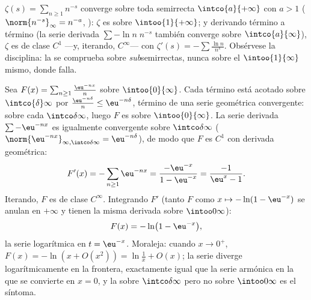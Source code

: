 \begin{example}\label{ex:b2:funcseq:zeta}
$\zeta(s) = \sum_{n\geq1} n^{-s}$ converge  sobre toda
semirrecta $\intco{a}{+\infty}$ con $a > 1$ ($\norm{n^{-s}}_\infty =
n^{-a}$, ): $\zeta$ es  sobre $\intoo{1}{+\infty}$;
y derivando término a término (la serie derivada $\sum -\ln n\;
n^{-s}$ también converge  sobre $\intco{a}{\infty}$),
$\zeta$ es de clase $C^1$ ---y, iterando, $C^\infty$--- con
$\zeta'(s) = -\sum \frac{\ln n}{n^s}$. Obsérvese la disciplina: la
 se comprueba sobre \emph{sub}semirrectas, nunca
sobre el  $\intoo{1}{\infty}$ mismo, donde falla.
\end{example}

\begin{example}\label{ex:b2:funcseq:logseries}
Sea $F(x) = \sum_{n\geq1} \frac{\eu^{-nx}}{n}$ sobre
$\intoo{0}{\infty}$. Cada término está acotado sobre
$\intco{\delta}\infty$ por $\frac{\eu^{-n\delta}}{n} \leq
\eu^{-n\delta}$, término de una serie geométrica convergente:
 sobre cada $\intco\delta\infty$, luego $F$ es
 sobre $\intoo{0}{\infty}$. La serie derivada $\sum
-\eu^{-nx}$ es igualmente  convergente sobre
$\intco\delta\infty$ ($\norm{\eu^{-nx}}_{\infty,\intco\delta\infty} =
\eu^{-n\delta}$), de modo que $F$ es $C^1$ con derivada
geométrica:
\[
F'(x) = -\sum_{n\geq1}\eu^{-nx}
= \frac{-\eu^{-x}}{1 - \eu^{-x}}
= \frac{-1}{\eu^{x} - 1} .
\]
Iterando, $F$ es de clase $C^\infty$. Integrando $F'$ (tanto $F$ como
$x \mapsto -\ln(1 - \eu^{-x})$ se anulan en $+\infty$ y tienen la
misma derivada sobre $\intoo0\infty$):
\[
F(x) = -\ln\bigl(1 - \eu^{-x}\bigr),
\]
la serie logarítmica en $t = \eu^{-x}$. Moraleja: cuando $x \to
0^+$, $F(x) = -\ln(x + O(x^2)) = \ln\frac1x + O(x)$; la serie diverge
logarítmicamente en la frontera, exactamente igual que la serie
armónica en la que se convierte en $x = 0$, y la 
sobre $\intco\delta\infty$ pero no sobre $\intoo0\infty$ es el
síntoma.
\end{example}

